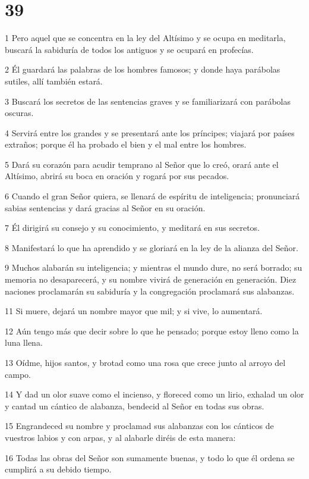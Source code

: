 \chapter{39}

\par 1 Pero aquel que se concentra en la ley del Altísimo y se ocupa en meditarla, buscará la sabiduría de todos los antiguos y se ocupará en profecías.
\par 2 Él guardará las palabras de los hombres famosos; y donde haya parábolas sutiles, allí también estará.
\par 3 Buscará los secretos de las sentencias graves y se familiarizará con parábolas oscuras.
\par 4 Servirá entre los grandes y se presentará ante los príncipes; viajará por países extraños; porque él ha probado el bien y el mal entre los hombres.
\par 5 Dará su corazón para acudir temprano al Señor que lo creó, orará ante el Altísimo, abrirá su boca en oración y rogará por sus pecados.
\par 6 Cuando el gran Señor quiera, se llenará de espíritu de inteligencia; pronunciará sabias sentencias y dará gracias al Señor en su oración.
\par 7 Él dirigirá su consejo y su conocimiento, y meditará en sus secretos.
\par 8 Manifestará lo que ha aprendido y se gloriará en la ley de la alianza del Señor.
\par 9 Muchos alabarán su inteligencia; y mientras el mundo dure, no será borrado; su memoria no desaparecerá, y su nombre vivirá de generación en generación.
Diez naciones proclamarán su sabiduría y la congregación proclamará sus alabanzas.
\par 11 Si muere, dejará un nombre mayor que mil; y si vive, lo aumentará.
\par 12 Aún tengo más que decir sobre lo que he pensado; porque estoy lleno como la luna llena.
\par 13 Oídme, hijos santos, y brotad como una rosa que crece junto al arroyo del campo.
\par 14 Y dad un olor suave como el incienso, y floreced como un lirio, exhalad un olor y cantad un cántico de alabanza, bendecid al Señor en todas sus obras.
\par 15 Engrandeced su nombre y proclamad sus alabanzas con los cánticos de vuestros labios y con arpas, y al alabarle diréis de esta manera:
\par 16 Todas las obras del Señor son sumamente buenas, y todo lo que él ordena se cumplirá a su debido tiempo.
